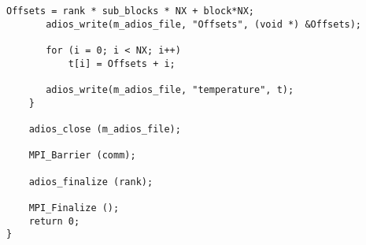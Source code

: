 \begin{lstlisting}[alsolanguage=C]
       Offsets = rank * sub_blocks * NX + block*NX;
       adios_write(m_adios_file, "Offsets", (void *) &Offsets);

       for (i = 0; i < NX; i++)
           t[i] = Offsets + i;

       adios_write(m_adios_file, "temperature", t);
    }

    adios_close (m_adios_file);

    MPI_Barrier (comm);

    adios_finalize (rank);

    MPI_Finalize ();
    return 0;
}

\end{lstlisting}

